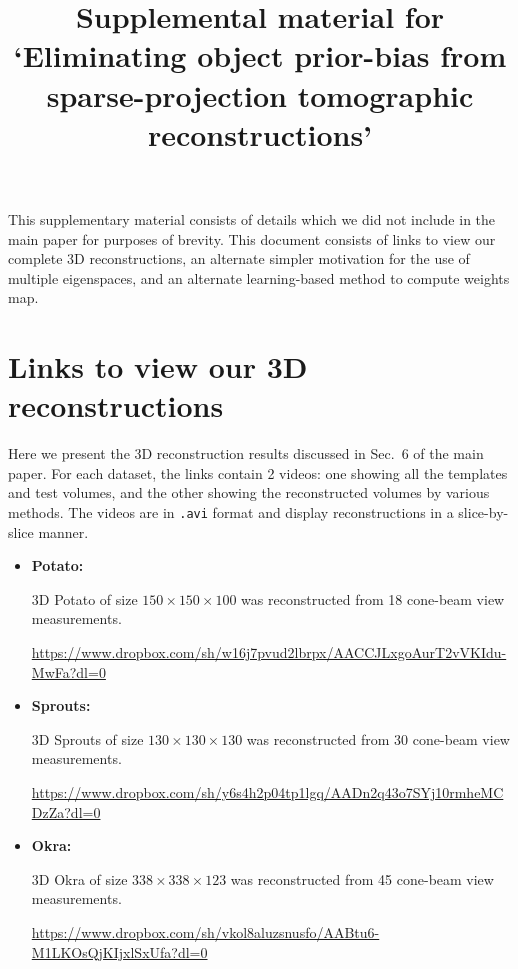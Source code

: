 \documentclass{article}
\title{Supplemental material for `Eliminating object prior-bias from sparse-projection
tomographic reconstructions'}
\begin{document}
\date{}
\maketitle
This supplementary material consists of details which we did not
include in the main paper for purposes of brevity. This document
consists of links to view our complete 3D reconstructions, an
alternate simpler motivation for the use of multiple eigenspaces, and an
alternate learning-based method to compute weights map. %

\tableofcontents


\section{Links to view our 3D reconstructions}
Here we present the 3D reconstruction results discussed in Sec.~6 of
the main paper. For each dataset, the links contain 2 videos: one
showing all the templates and test volumes, and the other showing the
reconstructed volumes by various methods. The videos are in
\verb+.avi+ format and display reconstructions in a slice-by-slice
manner.

\begin{itemize}

\item \textbf{Potato:} 

    3D Potato of size $150\times 150\times 100$ was reconstructed from 18 cone-beam view measurements.

  \url{https://www.dropbox.com/sh/w16j7pvud2lbrpx/AACCJLxgoAurT2vVKIdu-MwFa?dl=0}
\item \textbf{Sprouts:}
 
    3D Sprouts of size $130\times 130\times 130$ was reconstructed from 30 cone-beam view measurements.

    \url{https://www.dropbox.com/sh/y6s4h2p04tp1lgq/AADn2q43o7SYj10rmheMCDzZa?dl=0}
 \item \textbf{Okra:}

  3D Okra of size $338\times 338\times 123$ was reconstructed from 45 cone-beam view measurements.

  \url{https://www.dropbox.com/sh/vkol8aluzsnusfo/AABtu6-M1LKOsQjKIjxlSxUfa?dl=0}
\end{itemize}
\end{document}
